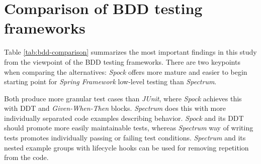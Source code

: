 \section{Comparison of BDD testing frameworks}
{\renewcommand{\arraystretch}{1.3}
\begin{table}[H]
        \caption {Summary of studied aspects of low-level testing with BDD frameworks } \label{tab:bdd-comparison}
\end{table}
}

Table \ref{tab:bdd-comparison} summarizes the most important findings in this study from the viewpoint of the
BDD testing frameworks. There are two keypoints when comparing the alternatives: \textit{Spock} offers more mature
and easier to begin starting point for \textit{Spring Framework} low-level testing than \textit{Spectrum}.

Both produce more
granular test cases than \textit{JUnit}, where \textit{Spock} achieves this with DDT and \textit{Given-When-Then} blocks. \textit{Spectrum} does this with more individually separated
code examples describing behavior. \textit{Spock} and its DDT should promote more easily maintainable tests, whereas \textit{Spectrum}
way of writing tests promotes individually passing or failing test conditions. \textit{Spectrum} and
its nested example groups with lifecycle hooks can be used for removing repetition from the code.

